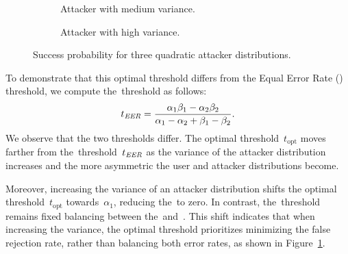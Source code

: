 \documentclass[conference,compsoc]{IEEEtran}
\begin{document}
\begin{figure}[t]
\begin{subfigure}[t]{0.31\textwidth}
\caption{Attacker with medium variance.}
\end{subfigure}
\hfill
\begin{subfigure}[t]{0.31\textwidth}
\centering
{}
\caption{Attacker with high variance.}
\end{subfigure}

\medskip

\caption{Success probability for three quadratic attacker distributions.}
\label{fig:success_per_attacker_1_quadratic_cred}
\end{figure}

To demonstrate that this optimal threshold differs from the Equal Error Rate (\EER) threshold, we compute the~\EER threshold as follows:
\begin{equation*}
t_{\textit{EER}} = \frac{\alpha_1 \beta_1 - \alpha_2 \beta_2}{\alpha_1 - \alpha_2 + \beta_1 - \beta_2}.
\end{equation*}
We observe that the two thresholds differ.
The optimal threshold~$t_{\text{opt}}$ moves farther from the~\EER threshold~$t_{\textit{EER}}$ as the variance of the attacker distribution increases and the more asymmetric the user and attacker distributions become. 

Moreover, increasing the variance of an attacker distribution shifts the optimal threshold~$t_{\text{opt}}$ towards~$\alpha_1$, reducing the~\FRR to zero. In contrast, the~\EER threshold remains fixed balancing between the~\FAR and~\FRR. This shift indicates that when increasing the variance, the optimal threshold prioritizes minimizing the false rejection rate, rather than balancing both error rates, as shown in Figure~\ref{fig:success_per_attacker_1_quadratic_cred}.
\end{document}
